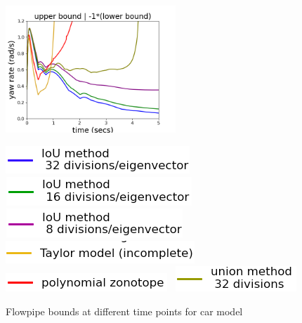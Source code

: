 \begin{figure}
\includegraphics[width=6.4cm,height=4.8cm]{autocarImages/ubToolYawRate.png}


\includegraphics[scale = 0.39]{autocarImages/leg1.png}~
  \includegraphics[scale = 0.41]{autocarImages/leg2.png}~
  \includegraphics[scale = 0.41]{autocarImages/leg3.png}
\includegraphics[scale = 0.39]{autocarImages/leg4.png}~
  \includegraphics[scale = 0.41]{autocarImages/leg5.png}~
  \includegraphics[scale = 0.41]{autocarImages/leg6.png}
  \caption{Flowpipe bounds at different time points for
    car model }\label{fig:flowcar}
\end{figure}

